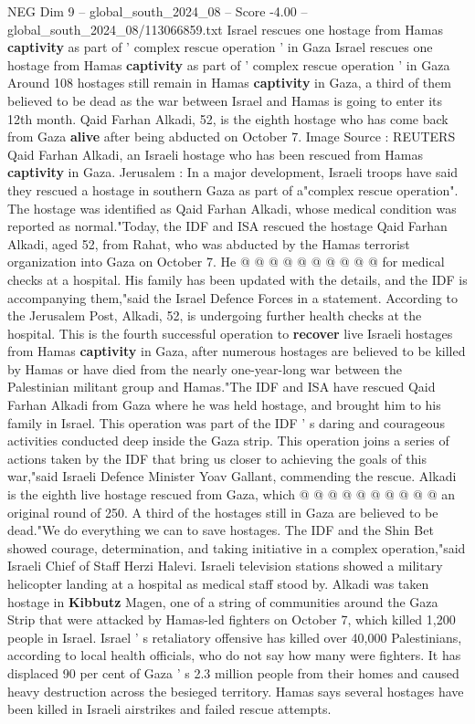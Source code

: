 \begin{textsample}{NEG Dim 9 – global\_south\_2024\_08 – Score -4.00 – global\_south\_2024\_08/113066859.txt}  \label{ex:f9_neg_388}
Israel rescues one hostage from Hamas \textbf{captivity} as part of ' complex rescue operation ' in Gaza Israel rescues one hostage from Hamas \textbf{captivity} as part of ' complex rescue operation ' in Gaza Around 108 hostages still remain in Hamas \textbf{captivity} in Gaza, a third of them believed to be dead as the war between Israel and Hamas is going to enter its 12th month.
Qaid Farhan Alkadi, 52, is the eighth hostage who has come back from Gaza \textbf{alive} after being abducted on October 7.
Image Source : REUTERS Qaid Farhan Alkadi, an Israeli hostage who has been rescued from Hamas \textbf{captivity} in Gaza.
Jerusalem : In a major development, Israeli troops have said they rescued a hostage in southern Gaza as part of a"complex rescue operation".
The hostage was identified as Qaid Farhan Alkadi, whose medical condition was reported as normal."Today, the IDF and ISA rescued the hostage Qaid Farhan Alkadi, aged 52, from Rahat, who was abducted by the Hamas terrorist organization into Gaza on October 7.
He @ @ @ @ @ @ @ @ @ @ for medical checks at a hospital.
His family has been updated with the details, and the IDF is accompanying them,"said the Israel Defence Forces in a statement.
According to the Jerusalem Post, Alkadi, 52, is undergoing further health checks at the hospital.
This is the fourth successful operation to \textbf{recover} live Israeli hostages from Hamas \textbf{captivity} in Gaza, after numerous hostages are believed to be killed by Hamas or have died from the nearly one-year-long war between the Palestinian militant group and Hamas."The IDF and ISA have rescued Qaid Farhan Alkadi from Gaza where he was held hostage, and brought him to his family in Israel.
This operation was part of the IDF ' s daring and courageous activities conducted deep inside the Gaza strip.
This operation joins a series of actions taken by the IDF that bring us closer to achieving the goals of this war,"said Israeli Defence Minister Yoav Gallant, commending the rescue.
Alkadi is the eighth live hostage rescued from Gaza, which @ @ @ @ @ @ @ @ @ @ an original round of 250.
A third of the hostages still in Gaza are believed to be dead."We do everything we can to save hostages.
The IDF and the Shin Bet showed courage, determination, and taking initiative in a complex operation,"said Israeli Chief of Staff Herzi Halevi.
Israeli television stations showed a military helicopter landing at a hospital as medical staff stood by.
Alkadi was taken hostage in \textbf{Kibbutz} Magen, one of a string of communities around the Gaza Strip that were attacked by Hamas-led fighters on October 7, which killed 1,200 people in Israel.
Israel ' s retaliatory offensive has killed over 40,000 Palestinians, according to local health officials, who do not say how many were fighters.
It has displaced 90 per cent of Gaza ' s 2.3 million people from their homes and caused heavy destruction across the besieged territory.
Hamas says several hostages have been killed in Israeli airstrikes and failed rescue attempts.

\end{textsample}
